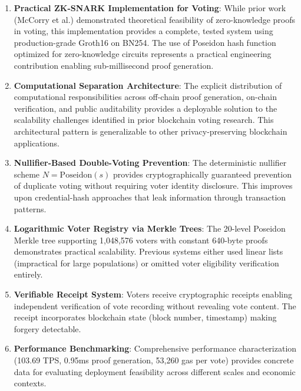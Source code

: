 \documentclass[conference]{IEEEtran}
\begin{document}
\begin{enumerate}
    \item \textbf{Practical ZK-SNARK Implementation for Voting}: While prior work (McCorry et al.) demonstrated theoretical feasibility of zero-knowledge proofs in voting, this implementation provides a complete, tested system using production-grade Groth16 on BN254. The use of Poseidon hash function optimized for zero-knowledge circuits represents a practical engineering contribution enabling sub-millisecond proof generation.
    
    \item \textbf{Computational Separation Architecture}: The explicit distribution of computational responsibilities across off-chain proof generation, on-chain verification, and public auditability provides a deployable solution to the scalability challenges identified in prior blockchain voting research. This architectural pattern is generalizable to other privacy-preserving blockchain applications.
    
    \item \textbf{Nullifier-Based Double-Voting Prevention}: The deterministic nullifier scheme $N = \text{Poseidon}(s)$ provides cryptographically guaranteed prevention of duplicate voting without requiring voter identity disclosure. This improves upon credential-hash approaches that leak information through transaction patterns.
    
    \item \textbf{Logarithmic Voter Registry via Merkle Trees}: The 20-level Poseidon Merkle tree supporting 1,048,576 voters with constant 640-byte proofs demonstrates practical scalability. Previous systems either used linear lists (impractical for large populations) or omitted voter eligibility verification entirely.
    
    \item \textbf{Verifiable Receipt System}: Voters receive cryptographic receipts enabling independent verification of vote recording without revealing vote content. The receipt incorporates blockchain state (block number, timestamp) making forgery detectable.
    
    \item \textbf{Performance Benchmarking}: Comprehensive performance characterization (103.69 TPS, 0.95ms proof generation, 53,260 gas per vote) provides concrete data for evaluating deployment feasibility across different scales and economic contexts.
\end{enumerate}
\end{document}
